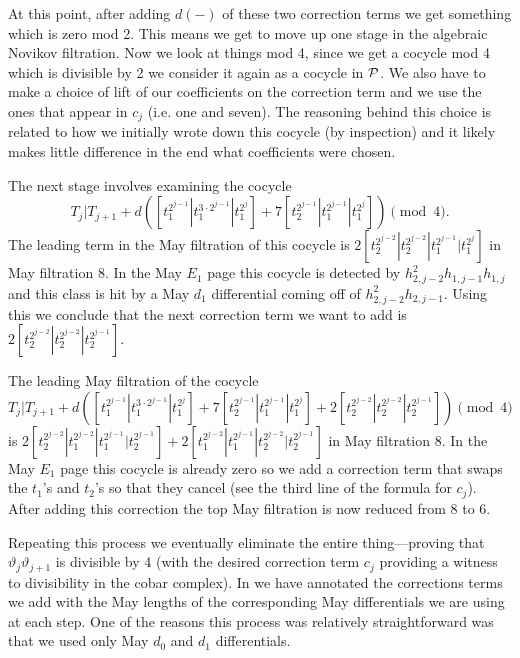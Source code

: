 At this point, after adding $d(-)$ of these two correction terms we get something which is zero mod 2.
This means we get to move up one stage in the algebraic Novikov filtration.
Now we look at things mod 4, since we get a cocycle mod 4 which is divisible by 2 we consider it again as a cocycle in $\P$. We also have to make a choice of lift of our coefficients on the correction term and we use the ones that appear in $c_j$ (i.e. one and seven). The reasoning behind this choice is related to how we initially wrote down this cocycle (by inspection) and it likely makes little difference in the end what coefficients were chosen.

The next stage involves examining the cocycle
\[ T_j|T_{j+1} + d\left([t_1^{2^{j-1}}|t_1^{3 \cdot 2^{j-1}}|t_1^{2^{j}}] + 7[t_2^{2^{j-1}}|t_1^{2^{j-1}}|t_1^{2^{j}}] \right) \pmod{4}. \]
The leading term in the May filtration of this cocycle is $2[t_2^{2^{j-2}}|t_2^{2^{j-2}}|t_1^{2^{j-1}}|t_1^{2^{j}}]$ in May filtration 8. In the May $E_1$ page this cocycle is detected by $h_{2,j-2}^2h_{1,j-1}h_{1,j}$ and this class is hit by a May $d_1$ differential coming off of $h_{2,j-2}^2h_{2,j-1}$. Using this we conclude that the next correction term we want to add is $2[t_2^{2^{j-2}}|t_2^{2^{j-2}}|t_2^{2^{j-1}}]$.

The leading May filtration of the cocycle
\[ T_j|T_{j+1} + d\left([t_1^{2^{j-1}}|t_1^{3 \cdot 2^{j-1}}|t_1^{2^{j}}] + 7[t_2^{2^{j-1}}|t_1^{2^{j-1}}|t_1^{2^{j}}] + 2[t_2^{2^{j-2}}|t_2^{2^{j-2}}|t_2^{2^{j-1}}] \right) \pmod{4} \]
is $2[t_2^{2^{j-2}}|t_1^{2^{j-2}}|t_1^{2^{j-1}}|t_2^{2^{j-1}}] + 2[t_1^{2^{j-2}}|t_1^{2^{j-1}}|t_2^{2^{j-2}}|t_2^{2^{j-1}}]$ in May filtration 8. In the May $E_1$ page this cocycle is already zero so we add a correction term that swaps the $t_1$'s and $t_2$'s so that they cancel (see the third line of the formula for $c_j$). After adding this correction the top May filtration is now reduced from 8 to 6.

Repeating this process we eventually eliminate the entire thing---proving that $\vartheta_j\vartheta_{j+1}$ is divisible by 4 (with the desired correction term $c_j$ providing a witness to divisibility in the cobar complex).
In  we have annotated the corrections terms we add with the May lengths of the corresponding May differentials we are using at each step. One of the reasons this process was relatively straightforward was that we used only May $d_0$ and $d_1$ differentials.


